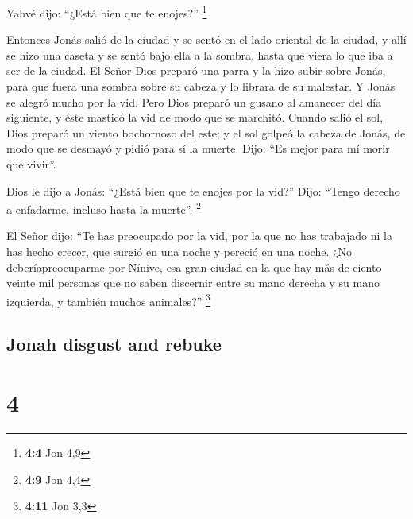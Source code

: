 \begin{paracol}{2}
 Yahvé dijo: ``¿Está bien que te enojes?'' \footnote{\textbf{4:4}
  Jon 4,9}

 Entonces Jonás salió de la ciudad y se sentó en el lado
oriental de la ciudad, y allí se hizo una caseta y se sentó bajo ella a
la sombra, hasta que viera lo que iba a ser de la ciudad. 
El Señor Dios preparó una parra y la hizo subir sobre Jonás, para que
fuera una sombra sobre su cabeza y lo librara de su malestar. Y Jonás se
alegró mucho por la vid.  Pero Dios preparó un gusano al
amanecer del día siguiente, y éste masticó la vid de modo que se
marchitó.  Cuando salió el sol, Dios preparó un viento
bochornoso del este; y el sol golpeó la cabeza de Jonás, de modo que se
desmayó y pidió para sí la muerte. Dijo: ``Es mejor para mí morir que
vivir''.

 Dios le dijo a Jonás: ``¿Está bien que te enojes por la
vid?'' Dijo: ``Tengo derecho a enfadarme, incluso hasta la muerte''.
\footnote{\textbf{4:9} Jon 4,4}

 El Señor dijo: ``Te has preocupado por la vid, por la
que no has trabajado ni la has hecho crecer, que surgió en una noche y
pereció en una noche.  ¿No deberíapreocuparme por Nínive,
esa gran ciudad en la que hay más de ciento veinte mil personas que no
saben discernir entre su mano derecha y su mano izquierda, y también
muchos animales?'' \footnote{\textbf{4:11} Jon 3,3} \switchcolumn
\begin{otherlanguage}{english}

\hypertarget{jonah-disgust-and-rebuke}{%
\subsection{Jonah disgust and rebuke}\label{jonah-disgust-and-rebuke}}

\hypertarget{section-7}{%
\section{4}\label{section-7}}


\end{otherlanguage}
\end{paracol}
